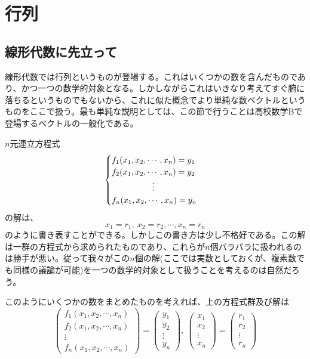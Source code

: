 \documentclass[dvipdfmx]{jsarticle}
\begin{document}

\section{行列}

\subsection{線形代数に先立って}
線形代数では行列というものが登場する。これはいくつかの数を含んだものであり、かつ一つの数学的対象となる。しかしながらこれはいきなり考えてすぐ腑に落ちるというものでもないから、これに似た概念でより単純な数ベクトルというものをここで扱う。最も単純な説明としては、この節で行うことは高校数学Bで登場するベクトルの一般化である。\\\par
\motiv $n$元連立方程式
\[\begin{cases}f_1(x_1,x_2,\cdots,x_n)=y_1\\f_2(x_1,x_2,\cdots,x_n)=y_2\\\hspace{17mm}\vdots\\f_n(x_1,x_2,\cdots,x_n)=y_n\end{cases}\]
の解は、
\[x_1=r_1,~x_2=r_2,\cdots,x_n=r_n\]
のように書き表すことができる。しかしこの書き方は少し不格好である。この解は一群の方程式から求められたものであり、これらが$n$個バラバラに扱われるのは勝手が悪い。従って我々がこの$n$個の解(ここでは実数としておくが、複素数でも同様の議論が可能)を一つの数学的対象として扱うことを考えるのは自然だろう。\par
このようにいくつかの数をまとめたものを考えれば、上の方程式群及び解は
\[\begin{pmatrix}f_1(x_1,x_2,\cdots,x_n)\\f_2(x_1,x_2,\cdots,x_n)\\\vdots\\f_n(x_1,x_2,\cdots,x_n)\end{pmatrix}=\begin{pmatrix}y_1\\y_2\\\vdots\\y_n\end{pmatrix},~\begin{pmatrix}x_1\\x_2\\\vdots\\x_n\end{pmatrix}=\begin{pmatrix}r_1\\r_2\\\vdots\\r_n\end{pmatrix}\]
\end{document}
